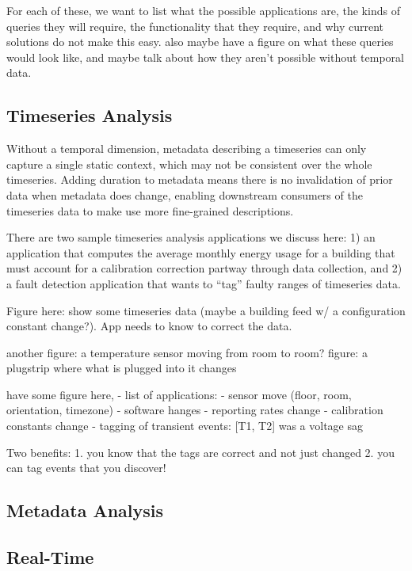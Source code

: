 For each of these, we want to list what the possible applications are,
the kinds of queries they will require, the functionality that they require,
and why current solutions do not make this easy. also maybe have a figure
on what these queries would look like, and maybe talk about how they aren't possible
without temporal data.
\fi

\subsection{Timeseries Analysis}

Without a temporal dimension, metadata describing a timeseries can only
capture a single static context, which may not be consistent over the
whole timeseries. Adding duration to metadata means there is no invalidation
of prior data when metadata does change, enabling downstream consumers
of the timeseries data to make use more fine-grained descriptions.

There are two sample timeseries analysis applications we discuss here: 1) an
application that computes the average monthly energy usage for a building that
must account for a calibration correction partway through data collection, and 2)
a fault detection application that wants to ``tag'' faulty ranges of timeseries data.



Figure here: show some timeseries data (maybe a building feed w/ a configuration
constant change?). App needs to know to correct the data.

another figure: a temperature sensor moving from room to room?
figure: a plugstrip where what is plugged into it changes
\fi

have some figure here,
- list of applications:
    - sensor move (floor, room, orientation, timezone)
    - software hanges
    - reporting rates change
    - calibration constants change
    - tagging of transient events: [T1, T2] was a voltage sag

Two benefits:
1. you know that the tags are correct and not just changed
2. you can tag events that you discover!
\fi

\subsection{Metadata Analysis}

\subsection{Real-Time}

